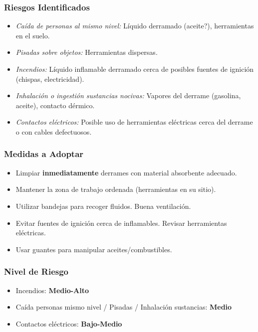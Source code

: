 \documentclass[12pt,a4paper]{article}
\begin{document}
	\subsubsection{Riesgos Identificados}
	\begin{itemize}
		\item \textit{Caída de personas al mismo nivel:} Líquido derramado (aceite?), herramientas en el suelo.
		\item \textit{Pisadas sobre objetos:} Herramientas dispersas.
		\item \textit{Incendios:} Líquido inflamable derramado cerca de posibles fuentes de ignición (chispas, electricidad).
		\item \textit{Inhalación o ingestión sustancias nocivas:} Vapores del derrame (gasolina, aceite), contacto dérmico.
		\item \textit{Contactos eléctricos:} Posible uso de herramientas eléctricas cerca del derrame o con cables defectuosos.
	\end{itemize}
	
	\subsubsection{Medidas a Adoptar}
	\begin{itemize}
		\item Limpiar \textbf{inmediatamente} derrames con material absorbente adecuado.
		\item Mantener la zona de trabajo ordenada (herramientas en su sitio).
		\item Utilizar bandejas para recoger fluidos. Buena ventilación.
		\item Evitar fuentes de ignición cerca de inflamables. Revisar herramientas eléctricas.
		\item Usar guantes para manipular aceites/combustibles.
	\end{itemize}
	
	\subsubsection{Nivel de Riesgo}
	\begin{itemize}
		\item Incendios: \textbf{Medio-Alto}
		\item Caída personas mismo nivel / Pisadas / Inhalación sustancias: \textbf{Medio}
		\item Contactos eléctricos: \textbf{Bajo-Medio}
	\end{itemize}
	
\end{document}
